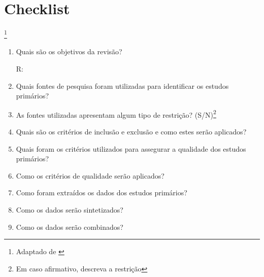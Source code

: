 \documentclass[a4paper,11pt]{article}
\begin{document}
\section{Checklist}\footnote{Adaptado de \cite{kitchenham2007guidelines}}
\begin{enumerate}
\item{Quais são os objetivos da revisão?}

R:

\item{Quais fontes de pesquisa foram utilizadas para identificar os estudos primários?}

\item{As fontes utilizadas apresentam algum tipo de restrição?  (S/N)\footnote{Em caso afirmativo, descreva a restrição}}
\item{Quais são os critérios de inclusão e exclusão e como estes serão aplicados?}

\item{Quais foram os critérios utilizados para assegurar a qualidade dos estudos primários?}

\item{Como os critérios de qualidade serão aplicados?}

\item{Como foram extraídos os dados dos estudos primários?}

\item{Como os dados serão sintetizados?}

\item{Como os dados serão combinados?}

\end{enumerate}


\end{document}
